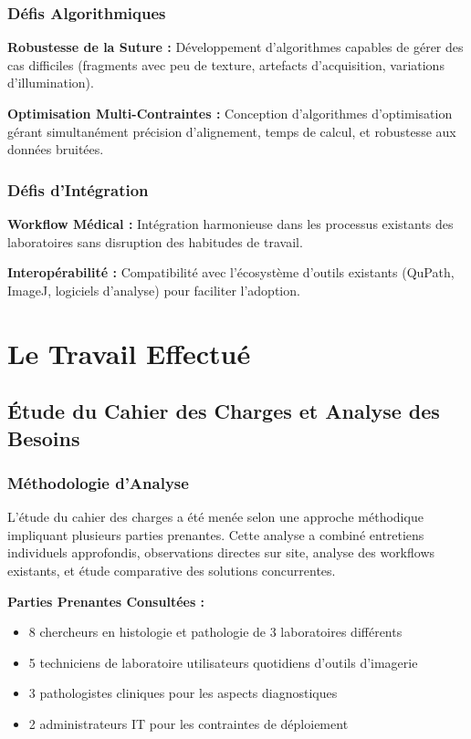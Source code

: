 \documentclass[12pt,a4paper]{article}
\begin{document}
\subsubsection{Défis Algorithmiques}

\textbf{Robustesse de la Suture :} Développement d'algorithmes capables de gérer des cas difficiles (fragments avec peu de texture, artefacts d'acquisition, variations d'illumination).

\textbf{Optimisation Multi-Contraintes :} Conception d'algorithmes d'optimisation gérant simultanément précision d'alignement, temps de calcul, et robustesse aux données bruitées.

\subsubsection{Défis d'Intégration}

\textbf{Workflow Médical :} Intégration harmonieuse dans les processus existants des laboratoires sans disruption des habitudes de travail.

\textbf{Interopérabilité :} Compatibilité avec l'écosystème d'outils existants (QuPath, ImageJ, logiciels d'analyse) pour faciliter l'adoption.

\newpage

\section{Le Travail Effectué}

\subsection{Étude du Cahier des Charges et Analyse des Besoins}

\subsubsection{Méthodologie d'Analyse}

L'étude du cahier des charges a été menée selon une approche méthodique impliquant plusieurs parties prenantes. Cette analyse a combiné entretiens individuels approfondis, observations directes sur site, analyse des workflows existants, et étude comparative des solutions concurrentes.

\textbf{Parties Prenantes Consultées :}
\begin{itemize}
\item 8 chercheurs en histologie et pathologie de 3 laboratoires différents
\item 5 techniciens de laboratoire utilisateurs quotidiens d'outils d'imagerie
\item 3 pathologistes cliniques pour les aspects diagnostiques
\item 2 administrateurs IT pour les contraintes de déploiement
\end{itemize}
\end{document}
